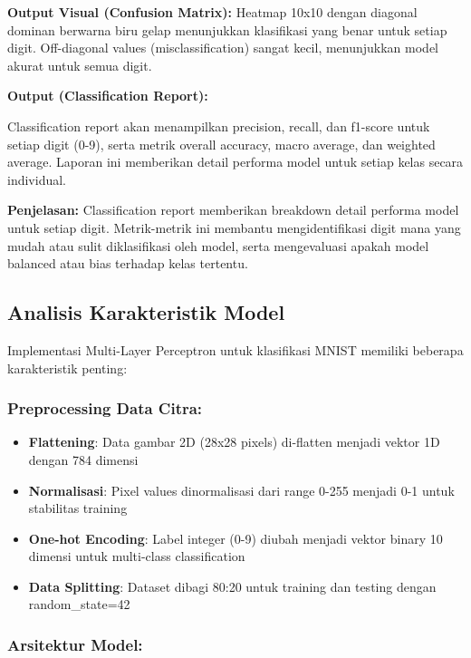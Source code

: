 \documentclass[12pt,a4paper]{article}
\begin{document}
\textbf{Output Visual (Confusion Matrix):} Heatmap 10x10 dengan diagonal dominan berwarna biru gelap menunjukkan klasifikasi yang benar untuk setiap digit. Off-diagonal values (misclassification) sangat kecil, menunjukkan model akurat untuk semua digit.

\textbf{Output (Classification Report):}

Classification report akan menampilkan precision, recall, dan f1-score untuk setiap digit (0-9), serta metrik overall accuracy, macro average, dan weighted average. Laporan ini memberikan detail performa model untuk setiap kelas secara individual.

\textbf{Penjelasan:} Classification report memberikan breakdown detail performa model untuk setiap digit. Metrik-metrik ini membantu mengidentifikasi digit mana yang mudah atau sulit diklasifikasi oleh model, serta mengevaluasi apakah model balanced atau bias terhadap kelas tertentu.

\subsection{Analisis Karakteristik Model}

Implementasi Multi-Layer Perceptron untuk klasifikasi MNIST memiliki beberapa karakteristik penting:

\subsubsection{Preprocessing Data Citra:}

\begin{itemize}
    \item \textbf{Flattening}: Data gambar 2D (28x28 pixels) di-flatten menjadi vektor 1D dengan 784 dimensi
    \item \textbf{Normalisasi}: Pixel values dinormalisasi dari range 0-255 menjadi 0-1 untuk stabilitas training
    \item \textbf{One-hot Encoding}: Label integer (0-9) diubah menjadi vektor binary 10 dimensi untuk multi-class classification
    \item \textbf{Data Splitting}: Dataset dibagi 80:20 untuk training dan testing dengan random\_state=42
\end{itemize}

\subsubsection{Arsitektur Model:}
\end{document}

